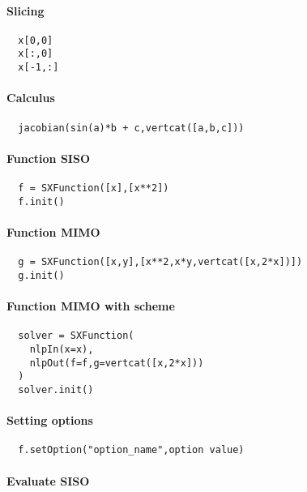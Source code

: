 \documentclass[a4paper,8pt]{article}
\begin{document}
\begin{multicols}{2}
\paragraph{Slicing}
\begin{verbatim}
  x[0,0]
  x[:,0]
  x[-1,:]
\end{verbatim}

\paragraph{Calculus}
\begin{verbatim}
  jacobian(sin(a)*b + c,vertcat([a,b,c]))
\end{verbatim}

\paragraph{Function SISO}

\begin{verbatim}
  f = SXFunction([x],[x**2])
  f.init()
\end{verbatim}

\paragraph{Function MIMO}
\begin{verbatim}
  g = SXFunction([x,y],[x**2,x*y,vertcat([x,2*x])])
  g.init()
\end{verbatim}

\paragraph{Function MIMO with scheme}
\begin{verbatim}
  solver = SXFunction(
    nlpIn(x=x),
    nlpOut(f=f,g=vertcat([x,2*x]))
  )
  solver.init()
\end{verbatim}

\paragraph{Setting options}
\begin{verbatim}
  f.setOption("option_name",option value)
\end{verbatim}

\paragraph{Evaluate SISO}


\end{multicols}
\end{document}

